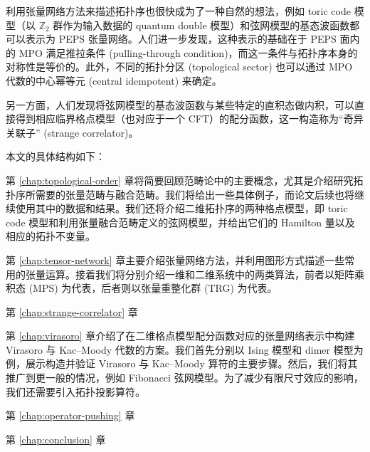 利用张量网络方法来描述拓扑序也很快成为了一种自然的想法，例如 toric code 模型（以 $\mathbb{Z}_2$ 群作为输入数据的 quantum double 模型）和弦网模型的基态波函数都可以表示为 PEPS 张量网络\cite{verstraete2006criticality,gu2009tensor2,buerschaper2009explicit,luo2017structure}。人们进一步发现，这种表示的基础在于 PEPS 面内的 MPO 满足推拉条件 (pulling-through condition)，而这一条件与拓扑序本身的对称性是等价的\cite{bultinck2017anyons,sahinoglu2021characterizing}。此外，不同的拓扑分区 (topological sector) 也可以通过 MPO 代数的中心幂等元 (central idempotent) 来确定\cite{bultinck2017anyons,vanhove2018mapping,aasen2020topological}。

另一方面，人们发现将弦网模型的基态波函数与某些特定的直积态做内积，可以直接得到相应临界格点模型（也对应于一个 CFT）的配分函数，这一构造称为“奇异关联子” (strange correlator)\cite{you2014wave,vanhove2018mapping,lootens2019cardy,aasen2020topological,vanhove2022topological}。

本文的具体结构如下：

第 \ref{chap:topological-order} 章将简要回顾范畴论中的主要概念，尤其是介绍研究拓扑序所需要的张量范畴与融合范畴。我们将给出一些具体例子，而论文后续也将继续使用其中的数据和结果。我们还将介绍二维拓扑序的两种格点模型，即 toric code 模型和利用张量融合范畴定义的弦网模型，并给出它们的 Hamilton 量以及相应的拓扑不变量。

第 \ref{chap:tensor-network} 章主要介绍张量网络方法，并利用图形方式描述一些常用的张量运算。接着我们将分别介绍一维和二维系统中的两类算法，前者以矩阵乘积态 (MPS) 为代表，后者则以张量重整化群 (TRG) 为代表。

第 \ref{chap:strange-correlator} 章

第 \ref{chap:virasoro} 章介绍了在二维格点模型配分函数对应的张量网络表示中构建 Virasoro 与 Kac--Moody 代数的方案。我们首先分别以 Ising 模型和 dimer 模型为例，展示构造并验证 Virasoro 与 Kac--Moody 算符的主要步骤。然后，我们将其推广到更一般的情况，例如 Fibonacci 弦网模型。为了减少有限尺寸效应的影响，我们还需要引入拓扑投影算符。

第 \ref{chap:operator-pushing} 章

第 \ref{chap:conclusion} 章

